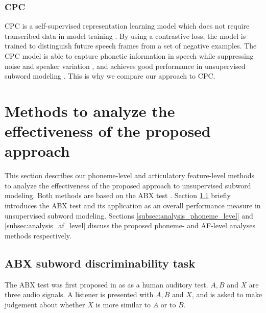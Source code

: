 \documentclass[transmag]{IEEEtran}
\begin{document}
\subsubsection{CPC}
CPC  is a  self-supervised  representation  learning  model which does not require transcribed data in model training \cite{oord2018cpc}. By  using  a contrastive  loss,  the  model  is trained  to  distinguish  future speech  frames  from  a  set  of  negative  examples.  The CPC model is able to capture  phonetic information  in  speech  while  suppressing  noise  and  speaker variation \cite{kahn2019librilight}, and achieves good performance  in  unsupervised  subword modeling \cite{kahn2019librilight,riviere2020unsupervised,Kharitonov2020data_augment}. This is why we compare our approach to CPC.




\section{Methods to analyze the effectiveness of the proposed approach}
\label{sec:method_analyze}
This section describes our phoneme-level and articulatory feature-level methods to analyze the effectiveness of the proposed approach to unsupervised subword modeling. Both methods are based on the ABX test   \cite{munson1950standardizing}.   Section  \ref{subsec:analysis_abx_overall} briefly introduces the ABX test and its application as an overall performance measure in unsupervised subword modeling. Sections \ref{subsec:analysis_phoneme_level} and \ref{subsec:analysis_af_level} discuss the proposed phoneme- and AF-level analyses methods respectively.
\subsection{ABX   subword discriminability task}
\label{subsec:analysis_abx_overall}
The ABX test was first proposed in   \cite{munson1950standardizing} as as a human auditory test. $A, B$ and  $X$ are three audio signals. A listener is presented with $A, B$ and $X$, and is asked to make judgement about whether $X$ is more similar to $A$ or to $B$. 
\end{document}
